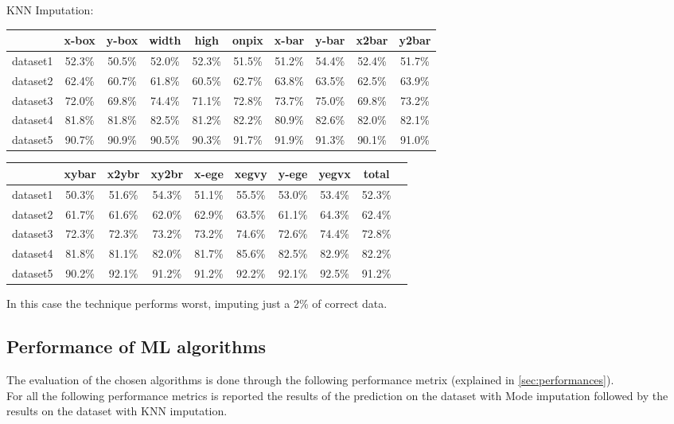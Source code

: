 \documentclass{article}
\begin{document}
KNN Imputation:
\begin{center}
    \begin{table}[h]
\begin{tabular}{|c|c|c|c|c|c|c|c|c|c|}
\hline
& x-box & y-box & width & high & onpix & x-bar & y-bar & x2bar & y2bar \\ \hline
dataset1 & 52.3\% & 50.5\% & 52.0\% & 52.3\% & 51.5\% & 51.2\% & 54.4\% & 52.4\% & 51.7\% \\ \hline
dataset2 & 62.4\% & 60.7\% & 61.8\% & 60.5\% & 62.7\% & 63.8\% & 63.5\% & 62.5\% & 63.9\% \\ \hline
dataset3 & 72.0\% & 69.8\% & 74.4\% & 71.1\% & 72.8\% & 73.7\% & 75.0\% & 69.8\% & 73.2\% \\ \hline
dataset4 & 81.8\% & 81.8\% & 82.5\% & 81.2\% & 82.2\% & 80.9\% & 82.6\% & 82.0\% & 82.1\% \\ \hline
dataset5 & 90.7\% & 90.9\% & 90.5\% & 90.3\% & 91.7\% & 91.9\% & 91.3\% & 90.1\% & 91.0\% \\ \hline
\end{tabular}
\end{table}
\begin{table}[h]
\begin{tabular}{|c|c|c|c|c|c|c|c|c|c|}
\hline
& xybar & x2ybr & xy2br & x-ege & xegvy & y-ege & yegvx & total \\ \hline
dataset1 & 50.3\% & 51.6\% & 54.3\% & 51.1\% & 55.5\% & 53.0\% & 53.4\% & 52.3\% \\ \hline
dataset2 & 61.7\% & 61.6\% & 62.0\% & 62.9\% & 63.5\% & 61.1\% & 64.3\% & 62.4\% \\ \hline
dataset3 & 72.3\% & 72.3\% & 73.2\% & 73.2\% & 74.6\% & 72.6\% & 74.4\% & 72.8\% \\ \hline
dataset4 & 81.8\% & 81.1\% & 82.0\% & 81.7\% & 85.6\% & 82.5\% & 82.9\% & 82.2\% \\ \hline
dataset5 & 90.2\% & 92.1\% & 91.2\% & 91.2\% & 92.2\% & 92.1\% & 92.5\% & 91.2\% \\ \hline
\end{tabular}
\end{table}
\end{center}
In this case the technique performs worst, imputing just a 2\% of correct data.

\subsection*{Performance of ML algorithms}
The evaluation of the chosen algorithms is done through the following performance metrix (explained in \ref{sec:performances}).\\
For all the following performance metrics is reported the results of the prediction on the dataset with Mode imputation followed by the results on the dataset with KNN imputation.
\end{document}
